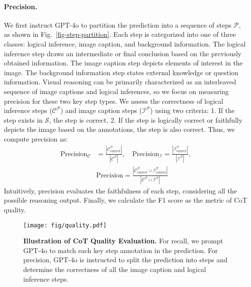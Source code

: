  \paragraph{Precision.} 
  We first instruct GPT-4o to partition the prediction into a sequence of steps $\mathcal{P}$, as shown in Fig.~\ref{fig-step-partition}.
  Each step is categorized into one of three classes: logical inference, image caption, and background information. The logical inference step draws an intermediate or final conclusion based on the previously obtained information. The image caption step depicts elements of interest in the image. The background information step states external knowledge or question information. Visual reasoning can be primarily characterized as an interleaved sequence of image captions and logical inferences, so we focus on measuring precision for these two key step types. We assess the correctness of logical inference steps ($\mathcal{C}^{\mathcal{P}}$) and image caption steps ($\mathcal{I}^{\mathcal{P}}$) using two criteria: 1. If the step exists in $\mathcal{S}$, the step is correct. 2. If the step is logically correct or faithfully depicts the image based on the annotations, the step is also correct. Thus, we compute precision as:
\begin{align}
    \text{Precision}_{\mathcal{C}} &= \frac{\left| \mathcal{C}^{\mathcal{P}}_{\text{correct}} \right|}{\left| \mathcal{C}^{\mathcal{P}} \right|}, \quad
    \text{Precision}_{\mathcal{I}} = \frac{\left| \mathcal{I}^{\mathcal{P}}_{\text{correct}} \right|}{\left| \mathcal{I}^{\mathcal{P}} \right|}, \\
    & \text{Precision} = \frac{\left| \mathcal{C}^{\mathcal{P}}_{\text{correct}} \cup \mathcal{I}^{\mathcal{P}}_{\text{correct}} \right|}{\left| \mathcal{C}^{\mathcal{P}} \cup \mathcal{I}^{\mathcal{P}} \right|}
\end{align}
Intuitively, precision evaluates the faithfulness of each step, considering all the possible reasoning output. Finally, we calculate the F1 score as the metric of CoT quality.


\begin{figure*}[!t]
\centering
\texttt{[image: fig/quality.pdf]} 
\caption{\textbf{Illustration of CoT Quality Evaluation.} For recall, we prompt GPT-4o to match each key step annotation in the prediction. For precision, GPT-4o is instructed to split the prediction into steps and determine the correctness of all the image caption and logical inference steps.}
\label{fig:quality}
\vspace{-0.17cm}
\end{figure*}

